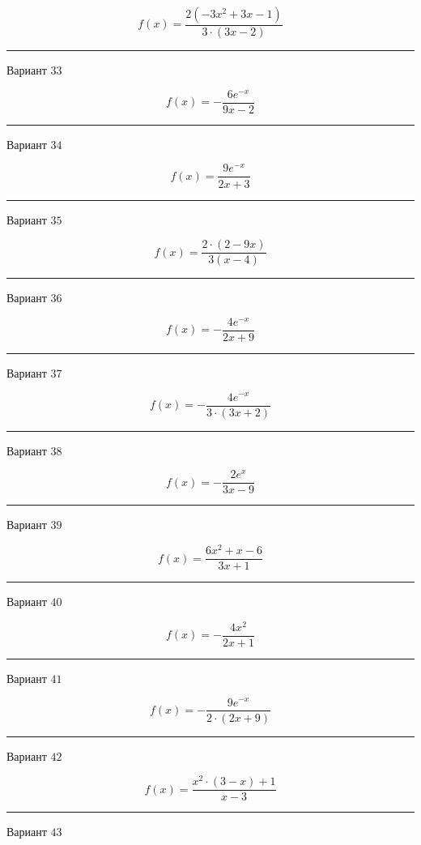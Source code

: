 \documentclass[11pt]{report}
\begin{document}
$$f(x) = \frac{2 \left(- 3 x^{2} + 3 x - 1\right)}{3 \cdot \left(3 x - 2\right)}$$
\begin{center}
\noindent\rule{8cm}{0.4pt}
\end{center}
Вариант $33$


$$f(x) = - \frac{6 e^{- x}}{9 x - 2}$$
\begin{center}
\noindent\rule{8cm}{0.4pt}
\end{center}
Вариант $34$


$$f(x) = \frac{9 e^{- x}}{2 x + 3}$$
\begin{center}
\noindent\rule{8cm}{0.4pt}
\end{center}
Вариант $35$


$$f(x) = \frac{2 \cdot \left(2 - 9 x\right)}{3 \left(x - 4\right)}$$
\begin{center}
\noindent\rule{8cm}{0.4pt}
\end{center}
Вариант $36$


$$f(x) = - \frac{4 e^{- x}}{2 x + 9}$$
\begin{center}
\noindent\rule{8cm}{0.4pt}
\end{center}
Вариант $37$


$$f(x) = - \frac{4 e^{- x}}{3 \cdot \left(3 x + 2\right)}$$
\begin{center}
\noindent\rule{8cm}{0.4pt}
\end{center}
Вариант $38$


$$f(x) = - \frac{2 e^{x}}{3 x - 9}$$
\begin{center}
\noindent\rule{8cm}{0.4pt}
\end{center}
Вариант $39$


$$f(x) = \frac{6 x^{2} + x - 6}{3 x + 1}$$
\begin{center}
\noindent\rule{8cm}{0.4pt}
\end{center}
Вариант $40$


$$f(x) = - \frac{4 x^{2}}{2 x + 1}$$
\begin{center}
\noindent\rule{8cm}{0.4pt}
\end{center}
Вариант $41$


$$f(x) = - \frac{9 e^{- x}}{2 \cdot \left(2 x + 9\right)}$$
\begin{center}
\noindent\rule{8cm}{0.4pt}
\end{center}
Вариант $42$


$$f(x) = \frac{x^{2} \cdot \left(3 - x\right) + 1}{x - 3}$$
\begin{center}
\noindent\rule{8cm}{0.4pt}
\end{center}
Вариант $43$
\end{document}
